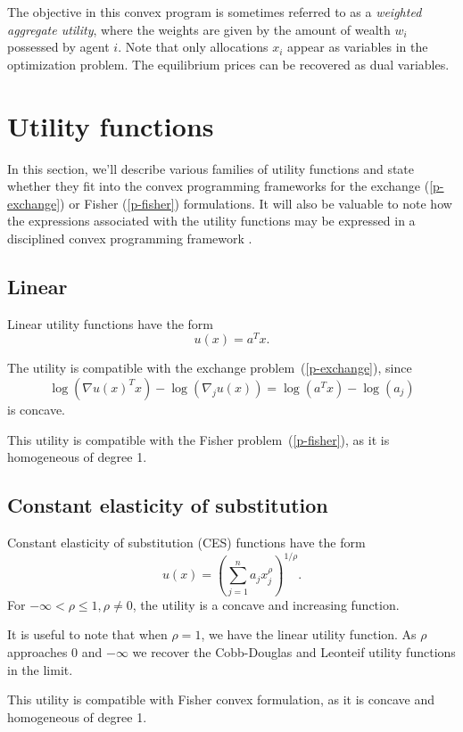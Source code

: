 \documentclass[12pt]{article}
\begin{document}
The objective in this convex program is sometimes referred to as a
\emph{weighted aggregate utility}, where the weights are given by the amount of
wealth $w_i$ possessed by agent $i$. Note that only allocations $x_i$ appear as
variables in the optimization problem. The equilibrium prices can be recovered
as dual variables.

\section{Utility functions}
\label{sec:util_funcs}

In this section, we'll describe various families of utility functions
and state whether they fit into the convex programming frameworks
for the exchange (\ref{p-exchange}) or Fisher (\ref{p-fisher}) formulations.
It will also
be valuable to note how the expressions associated
with the utility functions may be expressed in a disciplined
convex programming framework \cite{GBY:06,Grant2004,cvx,cvxpy}.


\subsection{Linear}

Linear utility functions have the form
\[
u(x) = a^T x.
\]

The utility is compatible with the exchange problem~(\ref{p-exchange}),
since
\[
\log(\nabla u(x)^T x) - \log(\nabla_j u(x))  = \log(a^T x) - \log(a_j)
\]
is concave.

This utility is compatible with the Fisher problem~(\ref{p-fisher}), as it is
homogeneous of degree 1.


\subsection{Constant elasticity of substitution}
Constant elasticity of substitution (CES) functions have the form
\[
u(x) = \left(\sum_{j=1}^n a_j x_j^\rho \right)^{1/\rho}.
\]
For $-\infty < \rho \leq 1, \rho \neq 0$, the utility is a concave and
increasing function.

It is useful to note that when $\rho = 1$, we have the linear utility function.
As $\rho$ approaches $0$ and $-\infty$ we recover the Cobb-Douglas and Leonteif
utility functions in the limit. %

This utility is compatible with Fisher convex formulation, as it is concave and
homogeneous of degree 1.
\end{document}
